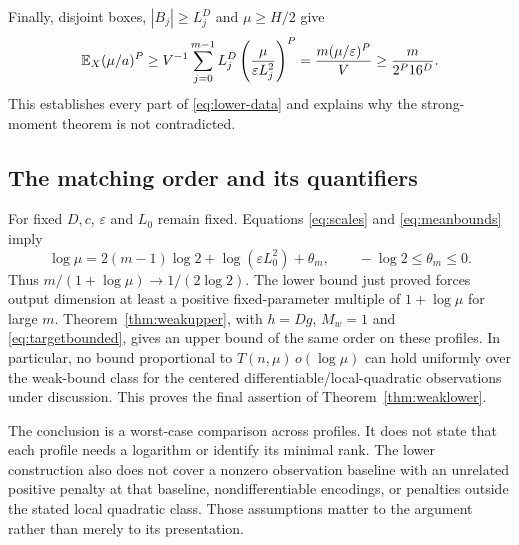 Finally, disjoint boxes, $|B_j|\ge L_j^D$ and $\mu\ge H/2$ give
\begin{equation}\label{eq:fullmomentgrowth}
 \mathbb E_X(\mu/a)^P
 \ge V^{-1}\sum_{j=0}^{m-1}L_j^D
                   \left(\frac\mu{\varepsilon L_j^2}\right)^P
 =\frac{m(\mu/\varepsilon)^P}{V}
 \ge\frac m{2^P16^D}.
\end{equation}
This establishes every part of \eqref{eq:lower-data} and explains why the
strong-moment theorem is not contradicted.

\subsection{The matching order and its quantifiers}
For fixed $D,c$, $\varepsilon$ and $L_0$ remain fixed. Equations
\eqref{eq:scales} and \eqref{eq:meanbounds} imply
\begin{equation}\label{eq:logmean}
 \log\mu=2(m-1)\log2+\log(\varepsilon L_0^2)+\theta_m,
 \qquad -\log2\le\theta_m\le0.
\end{equation}
Thus $m/(1+\log\mu)\to1/(2\log2)$.
The lower bound just proved forces output dimension at least a positive
fixed-parameter multiple of $1+\log\mu$ for large $m$.
Theorem~\ref{thm:weakupper}, with $h=Dg$, $M_w=1$ and
\eqref{eq:targetbounded}, gives an upper bound of the same order on these
profiles. In particular, no bound proportional to
$T(n,\mu)\,o(\log\mu)$ can hold uniformly over the weak-bound class for
the centered differentiable/local-quadratic observations under discussion.
This proves the final assertion of Theorem~\ref{thm:weaklower}.

The conclusion is a worst-case comparison across profiles. It does not
state that each profile needs a logarithm or identify its minimal rank.
The lower construction also does not cover a nonzero observation baseline
with an unrelated positive penalty at that baseline, nondifferentiable
encodings, or penalties outside the stated local quadratic class. Those
assumptions matter to the argument rather than merely to its presentation.
